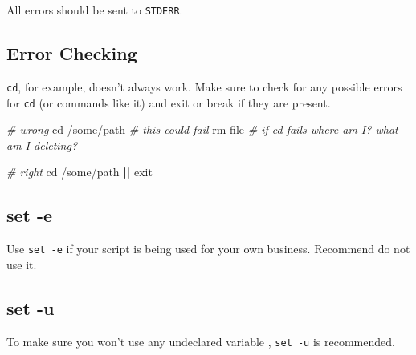 \documentclass[
]{book}
\newenvironment{Shaded}{\begin{snugshade}}{\end{snugshade}}
\newcommand{\BuiltInTok}[1]{#1}
\newcommand{\CommentTok}[1]{\textcolor[rgb]{0.56,0.35,0.01}{\textit{#1}}}
\newcommand{\ExtensionTok}[1]{#1}
\newcommand{\FunctionTok}[1]{\textcolor[rgb]{0.00,0.00,0.00}{#1}}
\newcommand{\KeywordTok}[1]{\textcolor[rgb]{0.13,0.29,0.53}{\textbf{#1}}}
\newcommand{\NormalTok}[1]{#1}
\newcommand{\OtherTok}[1]{\textcolor[rgb]{0.56,0.35,0.01}{#1}}
\newcommand{\StringTok}[1]{\textcolor[rgb]{0.31,0.60,0.02}{#1}}
\newcommand{\VariableTok}[1]{\textcolor[rgb]{0.00,0.00,0.00}{#1}}
\begin{document}
All errors should be sent to \texttt{STDERR}.

\hypertarget{error-checking}{%
\subsection{Error Checking}\label{error-checking}}

\texttt{cd}, for example, doesn't always work. Make sure to check for any possible
errors for \texttt{cd} (or commands like it) and exit or break if they are present.

\begin{Shaded}
\begin{Highlighting}[]
\CommentTok{# wrong}
\BuiltInTok{cd}\NormalTok{ /some/path }\CommentTok{# this could fail}
\FunctionTok{rm}\NormalTok{ file       }\CommentTok{# if cd fails where am I? what am I deleting?}

\CommentTok{# right}
\BuiltInTok{cd}\NormalTok{ /some/path }\KeywordTok{||} \BuiltInTok{exit}
\end{Highlighting}
\end{Shaded}

\hypertarget{set--e}{%
\subsection{set -e}\label{set--e}}

Use \texttt{set\ -e} if your script is being used for your own business. Recommend do
not use it.

\begin{Shaded}
\end{Shaded}

\hypertarget{set--u}{%
\subsection{set -u}\label{set--u}}

To make sure you won't use any undeclared variable , \texttt{set\ -u} is recommended.
\end{document}
